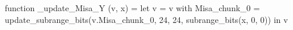 function _update_Misa_Y (v, x) = let v = { v with Misa_chunk_0 = update_subrange_bits(v.Misa_chunk_0, 24, 24, subrange_bits(x, 0, 0)) } in
  v
